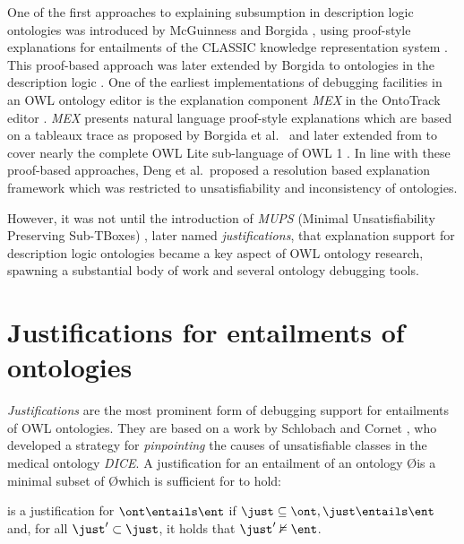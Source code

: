 One of the first approaches to explaining subsumption in description logic ontologies was introduced by McGuinness \cite{mcguinness96rp} and Borgida \cite{mcguinness95jb}, using proof-style explanations for entailments of the CLASSIC knowledge representation system \cite{patel-schneider91tc}. This proof-based approach was later extended by Borgida \cite{borgida99cn} to ontologies in the description logic . One of the earliest implementations of debugging facilities in an OWL ontology editor is the explanation component \emph{MEX} in the OntoTrack editor \cite{liebig04lx,liebig05jm}. \emph{MEX} presents natural language proof-style explanations which are based on a tableaux trace as proposed by Borgida et al.\ \cite{borgida99cn} and later extended from  to cover nearly the complete OWL Lite sub-language of OWL 1 \cite{liebig05jm}. In line with these proof-based approaches, Deng et al.\ proposed a resolution based explanation framework \cite{deng05aa} which was restricted to unsatisfiability and inconsistency of  ontologies. 

However, it was not until the introduction of \emph{MUPS} (Minimal Unsatisfiability Preserving Sub-TBoxes) \cite{schlobach03nc}, later named \emph{justifications}, that explanation support for description logic ontologies became a key aspect of OWL ontology research, spawning a substantial body of work and several ontology debugging tools.





\section{Justifications for entailments of ontologies}

\emph{Justifications} are the most prominent form of debugging support for entailments of OWL ontologies. They are based on a work by Schlobach and Cornet \cite{schlobach03nc,schlobach07aa}, who developed a strategy for \emph{pinpointing} the causes of unsatisfiable classes in the medical ontology \emph{DICE}.  A justification \J for an entailment \ent of an ontology \O is a minimal subset of \O which is sufficient for \ent to hold:
\begin{defn}[Justification]
\just is a justification for $ \ont \entails \ent$  if $\just \subseteq \ont,  \just \entails \ent$ and, for all $\just' \subset \just$, it holds that $ \just' \nvDash \ent $.
\end{defn}

